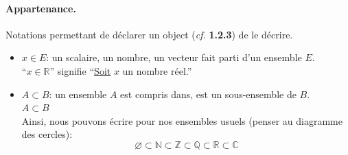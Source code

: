\documentclass[12pt]{article}
\begin{document}
\paragraph{Appartenance.} 
Notations permettant de déclarer un object (\textit{cf.} \textbf{1.2.3})
de le décrire.

\begin{itemize}
    \item[\Ii] $x \in E$: un scalaire, un nombre, un vecteur fait parti d'un ensemble $E$. \\
        \Ex 
        \enquote{$x \in \mathbb{R}$} signifie 
        \enquote{\underline{Soit} $x$ un nombre réel.}
    \item $A \subset B$: un ensemble $A$ est compris dans, est un sous-ensemble de $B$. \\
        \Ex $A \subset B$ \\
        Ainsi, nous pouvons écrire pour nos ensembles usuels 
        (penser au diagramme des cercles): 
        \begin{equation}
            \varnothing \subset \mathbb{N} \subset \mathbb{Z} \subset 
            \mathbb{Q} \subset \mathbb{R} \subset \mathbb{C}
        \end{equation}
\end{itemize}
\end{document}
